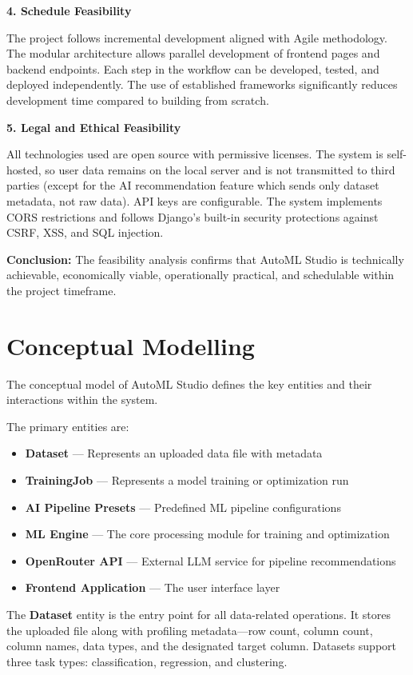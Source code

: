 \documentclass[12pt,a4paper]{report}
\begin{document}
\textbf{4. Schedule Feasibility}

The project follows incremental development aligned with Agile methodology. The modular architecture allows parallel development of frontend pages and backend endpoints. Each step in the workflow can be developed, tested, and deployed independently. The use of established frameworks significantly reduces development time compared to building from scratch.

\textbf{5. Legal and Ethical Feasibility}

All technologies used are open source with permissive licenses. The system is self-hosted, so user data remains on the local server and is not transmitted to third parties (except for the AI recommendation feature which sends only dataset metadata, not raw data). API keys are configurable. The system implements CORS restrictions and follows Django's built-in security protections against CSRF, XSS, and SQL injection.

\textbf{Conclusion:} The feasibility analysis confirms that AutoML Studio is technically achievable, economically viable, operationally practical, and schedulable within the project timeframe.

\section{Conceptual Modelling}
The conceptual model of AutoML Studio defines the key entities and their interactions within the system.

The primary entities are:
\begin{itemize}
\item \textbf{Dataset} — Represents an uploaded data file with metadata
\item \textbf{TrainingJob} — Represents a model training or optimization run
\item \textbf{AI Pipeline Presets} — Predefined ML pipeline configurations
\item \textbf{ML Engine} — The core processing module for training and optimization
\item \textbf{OpenRouter API} — External LLM service for pipeline recommendations
\item \textbf{Frontend Application} — The user interface layer
\end{itemize}

The \textbf{Dataset} entity is the entry point for all data-related operations. It stores the uploaded file along with profiling metadata—row count, column count, column names, data types, and the designated target column. Datasets support three task types: classification, regression, and clustering.
\end{document}
